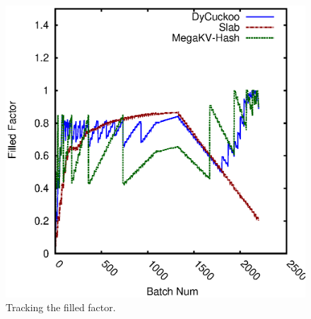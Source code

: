 \begin{figure}[htp]
\begin{minipage}{0.19\linewidth}
		\centerline{\dsali}
	\end{minipage}
	\begin{minipage}{0.19\linewidth}\centering
		\includegraphics[width=\linewidth]{pic/dynamic-load_factor/random/batch_LoadFactor-2.eps}
		\centerline{\dsrandom}
	\end{minipage}
	\caption{Tracking the filled factor.}
	\label{fig:track-stability}
\end{figure}
%
